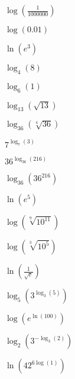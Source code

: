 \documentclass{ximera}
\begin{document}
\begin{problem}
\begin{question}
$\log \left(\frac{1}{1000000}\right)$
\end{question}

\begin{question}
$\log(0.01)$
\end{question}

\begin{question}
$\ln\left(e^3\right)$
\end{question}

\begin{question}
$\log_{4} (8)$
\end{question}

\begin{question}
$\log_{6} (1)$
\end{question}

\begin{question}
$\log_{13} \left(\sqrt{13}\right)$
\end{question}

\begin{question}
$\log_{36} \left(\sqrt[4]{36}\right)$
\end{question}

\begin{question}
$7^{\log_{7} (3)}$
\end{question}

\begin{question}
$36^{\log_{36}(216)}$
\end{question}

\begin{question}
$\log_{36} \left(36^{216}\right)$
\end{question}

\begin{question}
$\ln \left(e^{5} \right)$
\end{question}

\begin{question}
$\log \left(\sqrt[9]{10^{11}}\right)$
\end{question}

\begin{question}
$\log\left( \sqrt[3]{10^5} \right)$
\end{question}

\begin{question}
$\ln \left( \frac{1}{\sqrt{e}}\right)$
\end{question}

\begin{question}
$\log_{5} \left(3^{\log_{3} (5)}\right)$
\end{question}

\begin{question}
$\log\left(e^{\ln(100)}\right)$
\end{question}

\begin{question}
$\log_{2}\left(3^{-\log_{3}(2)}\right)$
\end{question}

\begin{question}\label{simplifyloglast}
$\ln\left(42^{6\log(1)}\right)$
\end{question}
\end{problem}
\end{document}
